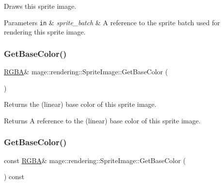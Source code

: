 Draws this sprite image.


\begin{DoxyParams}[1]{Parameters}
\mbox{\tt in}  & {\em sprite\+\_\+batch} & A reference to the sprite batch used for rendering this sprite image. \\
\hline
\end{DoxyParams}
\hypertarget{classmage_1_1rendering_1_1_sprite_image_ab1ef6e7677aa9e98fa55b6d64befdd63}{}\label{classmage_1_1rendering_1_1_sprite_image_ab1ef6e7677aa9e98fa55b6d64befdd63} 
\subsubsection{\texorpdfstring{Get\+Base\+Color()}{GetBaseColor()}\hspace{0.1cm}{\footnotesize\ttfamily [1/2]}}
{\footnotesize\ttfamily \hyperlink{structmage_1_1_r_g_b_a}{R\+G\+BA}\& mage\+::rendering\+::\+Sprite\+Image\+::\+Get\+Base\+Color (\begin{DoxyParamCaption}{ }\end{DoxyParamCaption})\hspace{0.3cm}{\ttfamily [noexcept]}}

Returns the (linear) base color of this sprite image.

\begin{DoxyReturn}{Returns}
A reference to the (linear) base color of this sprite image. 
\end{DoxyReturn}
\hypertarget{classmage_1_1rendering_1_1_sprite_image_a8d86a293c822486ab1cf37a31c2b0b74}{}\label{classmage_1_1rendering_1_1_sprite_image_a8d86a293c822486ab1cf37a31c2b0b74} 
\subsubsection{\texorpdfstring{Get\+Base\+Color()}{GetBaseColor()}\hspace{0.1cm}{\footnotesize\ttfamily [2/2]}}
{\footnotesize\ttfamily const \hyperlink{structmage_1_1_r_g_b_a}{R\+G\+BA}\& mage\+::rendering\+::\+Sprite\+Image\+::\+Get\+Base\+Color (\begin{DoxyParamCaption}{ }\end{DoxyParamCaption}) const\hspace{0.3cm}{\ttfamily [noexcept]}}

